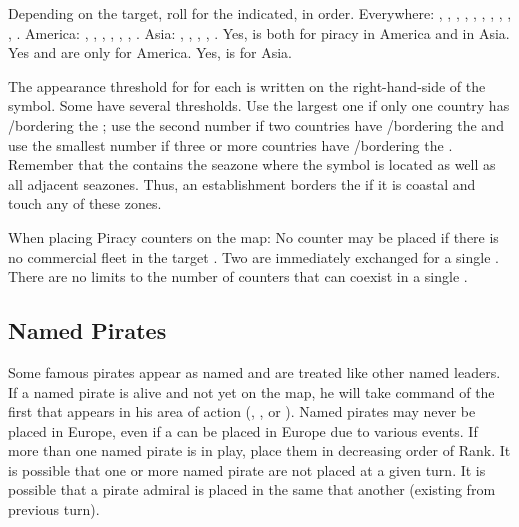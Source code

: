  Depending on the target, roll for the \STZ
indicated, in order.
\bparag Everywhere: , , ,
, , , , ,
, , .
\bparag America: , , ,
, , , .
\bparag Asia: , , , ,
.
\bparag Yes,  is both for piracy in America and in
Asia. Yes  and  are only for America. Yes,
 is for Asia.

\label{chEvents:Piracy Level}
The appearance threshold for \PIRATE for each \ROTW \STZ is written on
the right-hand-side of the \STZ symbol.
\bparag Some \STZ have several thresholds. Use the largest one if only
one country has \COL/\TP bordering the \STZ; use the second number if
two countries have \COL/\TP bordering the \STZ and use the smallest
number if three or more countries have \COL/\TP bordering the \STZ.
\bparag Remember that the \STZ contains the seazone where the symbol is
located as well as all adjacent seazones. Thus, an establishment borders
the \STZ if it is coastal and touch any of these zones.

 \label{chEvents:PiracyPlacement} When placing
Piracy counters on the map:
\bparag No \PIRATE counter may be placed if there is no commercial fleet
in the target \STZ.
\bparag Two \PIRATE\facemoins are immediately exchanged for a single
\PIRATE\faceplus.
\bparag There are no limits to the number of \corsaire counters that can
coexist in a single \STZ.



\subsection{Named Pirates}\label{chEvents:Named Pirates}

\aparag Some famous pirates appear as named  \LeaderA and
are treated like other named leaders.
\bparag If a named pirate is alive and not yet on the map, he will take
command of the first \PIRATE that appears in his area of action
(, , or \ROTW).
\bparag Named pirates may never be placed in Europe, even if a \PIRATE
can be placed in Europe due to various events.
\bparag If more than one named pirate is in play, place them in
decreasing order of Rank. It is possible that one or more named pirate
are not placed at a given turn. It is possible that a pirate admiral is
placed in the same \STZ that another (existing from previous turn).

